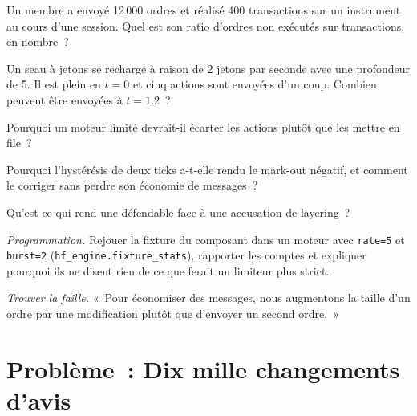 \begin{exercise}[$\star$]\label{exo:hf:the-quoting-engine:2}
Un membre a envoyé 12\,000 ordres et réalisé 400 transactions sur un instrument au cours d'une session. Quel est son ratio d'ordres non exécutés
sur transactions, en nombre~?
\end{exercise}

\begin{exercise}[$\star$]\label{exo:hf:the-quoting-engine:3}
Un seau à jetons se recharge à raison de 2 jetons par seconde avec une profondeur de 5. Il est plein en $t=0$ et cinq actions sont envoyées d'un coup. Combien peuvent être envoyées à
$t=1.2$~?
\end{exercise}

\begin{exercise}[$\star\star$]\label{exo:hf:the-quoting-engine:4}
Pourquoi un moteur limité devrait-il écarter les actions plutôt que les mettre en file~?
\end{exercise}

\begin{exercise}[$\star\star$]\label{exo:hf:the-quoting-engine:5}
Pourquoi l'hystérésis de deux ticks a-t-elle rendu le mark-out négatif, et comment le corriger sans perdre son économie de messages~?
\end{exercise}

\begin{exercise}[$\star\star$]\label{exo:hf:the-quoting-engine:6}
Qu'est-ce qui rend une  défendable face à une accusation de layering~?
\end{exercise}

\begin{exercise}[$\star\star\star$]\label{exo:hf:the-quoting-engine:7}
\emph{Programmation.} Rejouer la fixture du composant dans un moteur avec \texttt{rate=5} et \texttt{burst=2}
(\texttt{hf\_engine.fixture\_stats}), rapporter les comptes et expliquer pourquoi ils ne disent rien de ce que ferait un limiteur plus strict.
\end{exercise}

\begin{exercise}[$\star\star\star$]\label{exo:hf:the-quoting-engine:8}
\emph{Trouver la faille.} «~Pour économiser des messages, nous augmentons la taille d'un ordre par une modification plutôt que d'envoyer un second ordre.~»
\end{exercise}

\section{Problème~: Dix mille changements d'avis}

